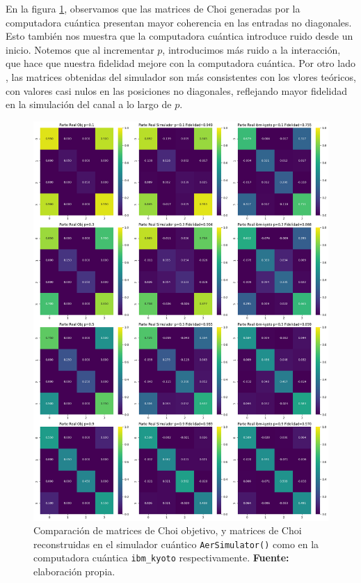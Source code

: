 \documentclass[letterpaper,12pt]{thesisECFM}
\theoremstyle{plain}
\theoremstyle{definition}
\theoremstyle{remark}
\newcommand{\1}{\mathbb{1}}
\begin{document}
En la figura \ref{fig:comparacion_choi}, observamos que las matrices de Choi
generadas por la computadora cuántica presentan mayor coherencia en las
entradas no diagonales. Esto también nos muestra que la computadora cuántica
introduce ruido desde un inicio. Notemos que al incrementar $p$, introducimos
más ruido a la interacción, que hace que nuestra fidelidad mejore con la
computadora cuántica. Por otro lado , las matrices obtenidas del simulador son
más consistentes con los vlores teóricos, con valores casi nulos en las
posiciones no diagonales, reflejando mayor fidelidad en la simulación del canal
a lo largo de $p$.

\begin{figure}[h!]
    \centering
    \includegraphics[width=0.95\linewidth]{imagenes/comparacion_choi.png}
    \caption{Comparación de matrices de Choi objetivo, y matrices de Choi reconstruidas en el simulador cuántico \texttt{AerSimulator()} como en la computadora cuántica \texttt{ibm\_kyoto} respectivamente. \textbf{Fuente:} elaboración propia.}
    \label{fig:comparacion_choi}
\end{figure}
\end{document}

